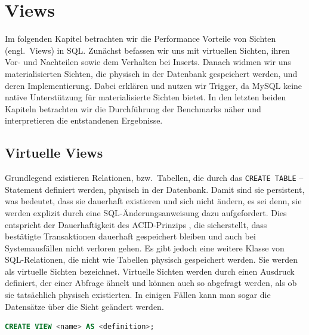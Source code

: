 
\chapter{Views}\label{ch:views}
Im folgenden Kapitel betrachten wir die Performance Vorteile von Sichten (engl.\ Views) in SQL.
Zunächst befassen wir uns mit virtuellen Sichten, ihren Vor- und Nachteilen sowie dem Verhalten bei Inserts.
Danach widmen wir uns materialisierten Sichten, die physisch in der Datenbank gespeichert werden, und deren Implementierung.
Dabei erklären und nutzen wir Trigger, da MySQL keine native Unterstützung für materialisierte Sichten bietet.
In den letzten beiden Kapiteln betrachten wir die Durchführung der Benchmarks näher und interpretieren die entstandenen Ergebnisse.

\section{Virtuelle Views}\label{sec:virtuelle-views}

Grundlegend existieren Relationen, bzw.\ Tabellen, die durch das \texttt{CREATE TABLE} – Statement definiert werden, physisch in der Datenbank.
Damit sind sie persistent, was bedeutet, dass sie dauerhaft existieren und sich nicht ändern, es sei denn, sie werden explizit durch eine SQL-Änderungsanweisung dazu aufgefordert.
Dies entspricht der Dauerhaftigkeit des ACID-Prinzips \cite{acid_eigenschaften}, die sicherstellt, dass bestätigte Transaktionen dauerhaft gespeichert bleiben und auch bei Systemausfällen nicht verloren gehen.
Es gibt jedoch eine weitere Klasse von SQL-Relationen, die nicht wie Tabellen physisch gespeichert werden.
Sie werden als virtuelle Sichten bezeichnet.
Virtuelle Sichten werden durch einen Ausdruck definiert, der einer Abfrage ähnelt und können auch so abgefragt werden, als ob sie tatsächlich physisch existierten.
In einigen Fällen kann man sogar die Datensätze über die Sicht geändert werden.
\vspace{-5pt}
\begin{lstlisting}[language=SQL,caption=Allgemeine View-Deklaration,label={lst:create_view}]
CREATE VIEW <name> AS <definition>;
\end{lstlisting}
\vspace{-5pt}

